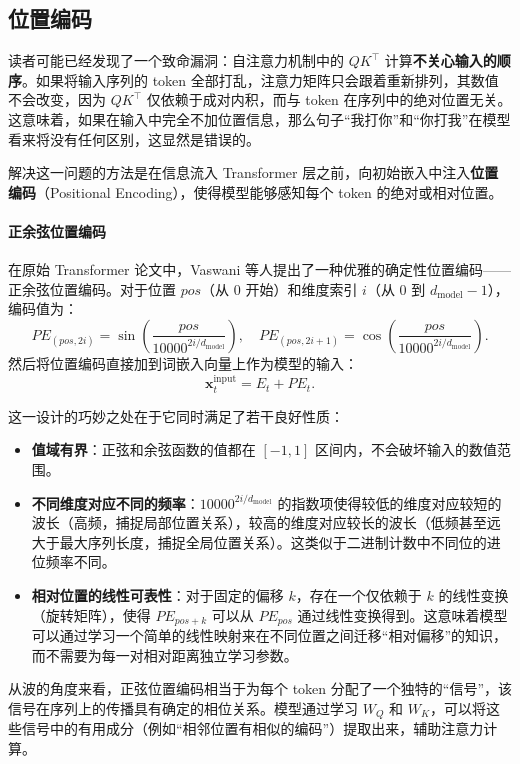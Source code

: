 \subsection{位置编码}

读者可能已经发现了一个致命漏洞：自注意力机制中的 $QK^\top$ 计算\textbf{不关心输入的顺序}。如果将输入序列的 token 全部打乱，注意力矩阵只会跟着重新排列，其数值不会改变，因为 $QK^\top$ 仅依赖于成对内积，而与 token 在序列中的绝对位置无关。这意味着，如果在输入中完全不加位置信息，那么句子“我打你”和“你打我”在模型看来将没有任何区别，这显然是错误的。

解决这一问题的方法是在信息流入 Transformer 层之前，向初始嵌入中注入\textbf{位置编码}（Positional Encoding），使得模型能够感知每个 token 的绝对或相对位置。

\paragraph{正余弦位置编码} 在原始 Transformer 论文\cite{vaswani2023attentionneed}中，Vaswani 等人提出了一种优雅的确定性位置编码——正余弦位置编码。对于位置 $pos$（从 $0$ 开始）和维度索引 $i$（从 $0$ 到 $d_{\text{model}}-1$），编码值为：
\begin{equation}
    PE_{(pos, 2i)} = \sin\left(\frac{pos}{10000^{2i / d_{\text{model}}}}\right), \quad
    PE_{(pos, 2i+1)} = \cos\left(\frac{pos}{10000^{2i / d_{\text{model}}}}\right).
\end{equation}
然后将位置编码直接加到词嵌入向量上作为模型的输入：
\[
\mathbf{x}_t^{\text{input}} = E_{t} + PE_t.
\]

这一设计的巧妙之处在于它同时满足了若干良好性质：
\begin{itemize}
    \item \textbf{值域有界}：正弦和余弦函数的值都在 $[-1, 1]$ 区间内，不会破坏输入的数值范围。
    \item \textbf{不同维度对应不同的频率}：$10000^{2i / d_{\text{model}}}$ 的指数项使得较低的维度对应较短的波长（高频，捕捉局部位置关系），较高的维度对应较长的波长（低频甚至远大于最大序列长度，捕捉全局位置关系）。这类似于二进制计数中不同位的进位频率不同。
    \item \textbf{相对位置的线性可表性}：对于固定的偏移 $k$，存在一个仅依赖于 $k$ 的线性变换（旋转矩阵），使得 $PE_{pos+k}$ 可以从 $PE_{pos}$ 通过线性变换得到。这意味着模型可以通过学习一个简单的线性映射来在不同位置之间迁移“相对偏移”的知识，而不需要为每一对相对距离独立学习参数。
\end{itemize}

从波的角度来看，正弦位置编码相当于为每个 token 分配了一个独特的“信号”，该信号在序列上的传播具有确定的相位关系。模型通过学习 $W_Q$ 和 $W_K$，可以将这些信号中的有用成分（例如“相邻位置有相似的编码”）提取出来，辅助注意力计算。


